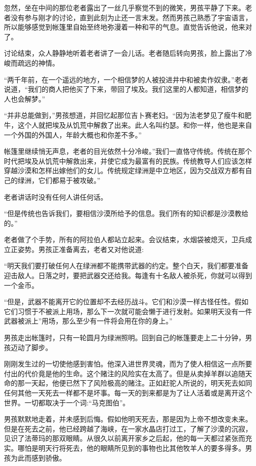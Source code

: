 \documentclass[twoside,openany]{book}
\begin{document}
忽然，坐在中间的那位老者露出了一丝几乎察觉不到的微笑，男孩平静了下来。老者没有参与刚才的讨论，直到此刻为止还一言末发。然而男孩己熟悉了宇宙语言，所以能够感觉到帐篷里自始至终地弥漫着一种和平的气息。直觉告诉他说，他来对了。

讨论结束，众人静静地听着老者讲了一会儿话。老者随后转向男孩，脸上露出了冷峻而疏远的神情。

“两千年前，在一个遥远的地方，一个相信梦的人被投进井中和被卖作奴隶。”老者说道，“我们的商人把他买了下来，带回了埃及。我们这里的人都知道，相信梦的人也会解梦。”

“并非总能做到，”男孩想道，并回忆起那位吉卜赛老妇。“因为法老梦见了瘦牛和肥牛，这个人就把埃及从饥荒中解救了出来。此人名叫约瑟。和你一样，他也是来自一个外国的外国人，年龄大概也和你差不多。”

帐篷里继续悄无声息，老者的目光依然十分冷峻。”我们一直恪守传统。传统在那个时代把埃及从饥荒中解救出来，并使它成为最富有的民族。传统教导人们应该怎样穿越沙漠和怎样出嫁他们的女儿。传统规定绿洲是中立地区，因为交战双方都有自己的绿洲，它们都易于被攻破。”

老者讲话时没有任何人讲任何话。

“但是传统也告诉我们，要相信沙漠所给予的信息。我们所有的知识都是沙漠教给的。”

老者做了个手势，所有的阿拉伯人都站立起来。会议结束，水烟袋被熄灭，卫兵成立正姿势。男孩正准备离去，老者又对他说道:

“明天我们要打破任何人在绿洲都不能携带武器的约定。整个白天，我们都要准备迎击敌人。日落之时，要把武器交还给我。每逢有十名敌人被杀死，你就可以得到一个金币。

“但是，武器不能离开它的位置却不去经历战斗。它们和沙漠一样古怪任性。假如它们习惯于不被派上用场，那么下一次就可能会懒于进行发射。如果明天没有一件武器被派上”用场，那么至少有一件将会用在你的身上。”

男孩走出帐篷时，只有一轮圆月为绿洲照明。回到自己的帐篷要走上二十分钟，男孩迈动了脚步。

刚刚发生过的一切使他感到害怕。他深入进世界灵魂，而为了使人相信这一点所要付出的代价竟是他的生命。这个赌注的风险实在太高了。但是从卖掉羊群以追随天命的那一天起，他便已然下了风险极高的赌注。正如赶驼人所说的，明天死去如同任何其他一天死去一样都不是坏事。每一天的到来都是为了让人活着或是离开这个世界。一切都取决于一个词:“马克图伯”。

男孩默默地走着，并未感到后悔。假如他明天死去，那是因为上帝不想改变未来。但是在死去之前，他已经跨越了海峡，在一家水晶店打过工，了解了沙漠的沉寂，见识了法蒂玛的那双眼睛。从很久以前离开家乡之后起，他的每一天都过紧张而充实。哪怕是明天行将死去，他的眼睛所见到的事物也比其他牧羊人的要多得多。男孩为此而感到骄傲。
\end{document}
